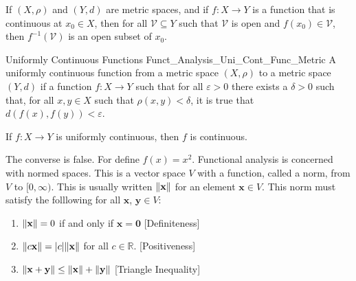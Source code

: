         \begin{theorem}
            If $(X,\rho)$ and $(Y,d)$ are metric spaces, and if
            $f:X\rightarrow{Y}$ is a function that is
            continuous at $x_{0}\in{X}$, then for
            all $\mathcal{V}\subseteq{Y}$ such that
            $\mathcal{V}$ is open and $f(x_{0})\in\mathcal{V}$,
            then $f^{-1}(\mathcal{V})$ is an open subset
            of $x_{0}$.
        \end{theorem}
        \begin{ldefinition}{Uniformly Continuous Functions}
              {Funct_Analysis_Uni_Cont_Func_Metric}
            A uniformly continuous function from a metric space
            $(X,\rho)$ to a metric space $(Y,d)$ if a function
            $f:X\rightarrow{Y}$ such that for all
            $\varepsilon>0$ there exists a $\delta>0$ such
            that, for all $x,y\in{X}$ such that
            $\rho(x,y)<\delta$, it is true that
            $d(f(x),f(y))<\varepsilon$.
        \end{ldefinition}
        \begin{theorem}
            If $f:X\rightarrow{Y}$ is uniformly continuous,
            then $f$ is continuous.
        \end{theorem}
        The converse is false. For define $f(x)=x^{2}$.
        Functional analysis is concerned with normed spaces.
        This is a vector space $V$ with a function, called
        a norm, from $V$ to $[0,\infty)$. This is usually
        written $\lVert\mathbf{x}\rVert$ for an element
        $\mathbf{x}\in{V}$. This norm must satisfy the
        folllowing for all $\mathbf{x}$, $\mathbf{y}\in{V}$:
        \begin{enumerate}
            \item $\lVert\mathbf{x}\rVert=0$ if and only
                  if $\mathbf{x}=\mathbf{0}$
                  \hfill[Definiteness]
            \item $\lVert c\mathbf{x}\rVert=|c|\lVert\mathbf{x}\rVert$
                  for all $c\in\mathbb{R}$.
                  \hfill[Positiveness]
            \item $\norm{\mathbf{x}+\mathbf{y}}%
                   \leq\norm{\mathbf{x}}+\norm{\mathbf{y}}$
                  \hfill[Triangle Inequality]
        \end{enumerate}
